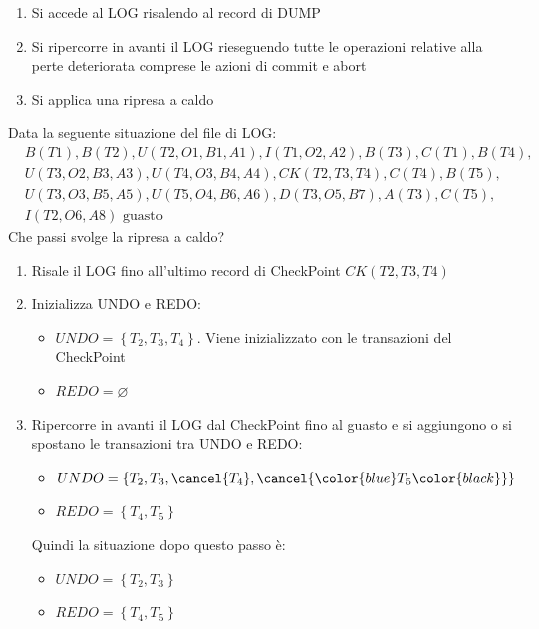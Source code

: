 \documentclass[a4paper,twoside]{article}
\begin{document}
\begin{itemize}
\begin{enumerate}
      \item Si accede al LOG risalendo al record di DUMP

      \item Si ripercorre in avanti il LOG rieseguendo tutte le operazioni relative
        alla perte deteriorata comprese le azioni di commit e abort

      \item Si applica una ripresa a caldo
    \end{enumerate}
\end{itemize}

\begin{exercise}
  Data la seguente situazione del file di LOG:
  \[
    \begin{aligned}
      & B(T1), B(T2), U(T2,O1,B1,A1), I(T1,O2,A2), B(T3), C(T1), B(T4), \\
      &U(T3,O2,B3,A3), U(T4,O3,B4,A4), CK(T2,T3,T4), C(T4), B(T5), \\
      & U(T3,O3,B5,A5), U(T5,O4,B6,A6), D(T3,O5,B7), A(T3), C(T5), \\
      &I(T2,O6,A8) \text{ guasto}
    \end{aligned}
  \] 
  Che passi svolge la ripresa a caldo?

  \begin{enumerate}
    \item Risale il LOG fino all'ultimo record di CheckPoint \( CK(T2,T3,T4) \)

    \item Inizializza UNDO e REDO:
      \begin{itemize}
        \item \( UNDO = \left\{ T_2, T_3, T_4 \right\} \). Viene inizializzato con le
          transazioni del CheckPoint
        \item \( REDO = \varnothing \)
      \end{itemize}

    \item Ripercorre in avanti il LOG dal CheckPoint fino al guasto e si aggiungono
      o si spostano le transazioni tra UNDO e REDO:
      \begin{itemize}
        \item \( UNDO = \left\{ T_2, T_3, \cancel{T_4}, \cancel{\color{blue}T_5\color{black}} \right\}  \) 
        \item \( REDO = \left\{ T_4, T_5 \right\}  \) 
      \end{itemize}
      Quindi la situazione dopo questo passo è:
      \begin{itemize}
        \item \( UNDO = \left\{ T_2, T_3 \right\}  \)
        \item \( REDO = \left\{ T_4, T_5 \right\}  \)
      \end{itemize}


\end{enumerate}
\end{exercise}
\end{document}
